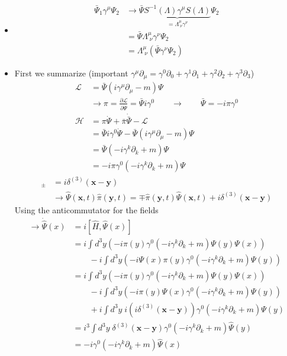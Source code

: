 \documentclass[10pt,a4paper]{report}
\theoremstyle{definition}
\begin{document}
\begin{itemize}
\item
\begin{align}
\bar{\Psi}_1\gamma^\mu\Psi_2
&\rightarrow\bar{\Psi}\underbrace{S^{-1}(\Lambda)\gamma^\mu S(\Lambda)}_{=\Lambda^\mu_{\;\nu}\gamma^\nu}\Psi_2\\
&=\bar{\Psi}\Lambda^\mu_{\;\nu}\gamma^\nu\Psi_2\\
&=\Lambda^\mu_{\;\nu}(\bar{\Psi}\gamma^\nu\Psi_2)
\end{align}

\item First we summarize (important $\gamma^\mu\partial_\mu=\gamma^0\partial_0+\gamma^1\partial_1+\gamma^2\partial_2+\gamma^3\partial_3$)
\begin{align}
\mathcal{L}&=\bar{\Psi}(i\gamma^\mu\partial_\mu-m)\Psi\\
&\rightarrow \pi=\frac{\partial\mathcal{L}}{\partial\dot{\Psi}}=\bar{\Psi}i\gamma^0\qquad\rightarrow\qquad\bar{\Psi}=-i\pi\gamma^0\\
\mathcal{H}
&=\pi \dot{\Psi}+\bar{\pi} \dot{\bar{\Psi}}-\mathcal{L}\\
&=\bar{\Psi}i\gamma^0\dot{\Psi}-\bar{\Psi}(i\gamma^\mu\partial_\mu-m)\Psi\\
&=\bar{\Psi}(-i\gamma^k\partial_k+m)\Psi\\
&=-i\pi\gamma^0(-i\gamma^k\partial_k+m)\Psi
\end{align}
\begin{align}
[\hat{\Psi}(\mathbf{x},t),\hat{\pi}(\mathbf{y},t)]_\pm&=i\delta^{(3)}(\mathbf{x}-\mathbf{y})\\
&\rightarrow\hat{\Psi}(\mathbf{x},t)\hat{\pi}(\mathbf{y},t)=\mp\hat{\pi}(\mathbf{y},t)\hat{\Psi}(\mathbf{x},t)+i\delta^{(3)}(\mathbf{x}-\mathbf{y})
\end{align}
Using the anticommutator for the fields
\begin{align}
\rightarrow\dot{\hat{\Psi}}(x)
&=i[\hat{H},\hat{\Psi}(x)]\\
&=i\int d^3y\left(-i\pi(y)\gamma^0(-i\gamma^k\partial_k+m)\Psi(y)\Psi(x)\right)\\
&\qquad-i\int d^3y\left(-i\Psi(x)\pi(y)\gamma^0(-i\gamma^k\partial_k+m)\Psi(y)\right)\\
&=i\int d^3y\left(-i\pi(y)\gamma^0(-i\gamma^k\partial_k+m)\Psi(y)\Psi(x)\right)\\
&\qquad- i\int d^3y\left(-i\pi(y)\Psi(x)\gamma^0(-i\gamma^k\partial_k+m)\Psi(y)\right)\\
&\qquad+i\int d^3y\;i(i\delta^{(3)}(\mathbf{x}-\mathbf{y}))\gamma^0(-i\gamma^k\partial_k+m)\Psi(y)\\
&=i^3\int d^3y\;\delta^{(3)}(\mathbf{x}-\mathbf{y}) \gamma^0\left(-i\gamma^k\partial_k+m\right)\hat{\Psi}(y)\\
&=-i\gamma^0\left(-i\gamma^k\partial_k+m\right)\hat{\Psi}(x)
\end{align}


\end{itemize}
\end{document}
